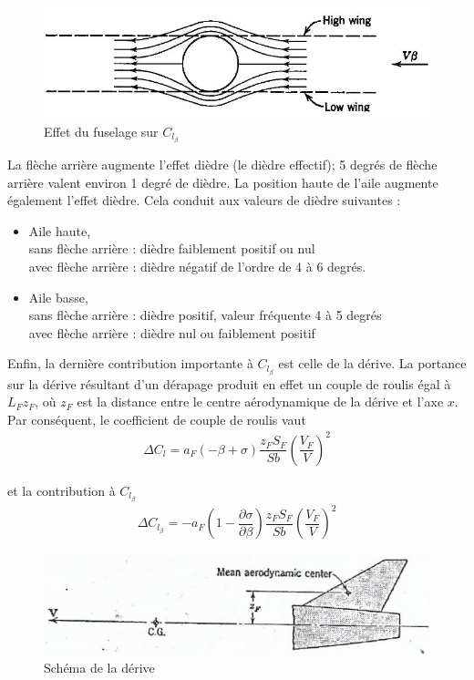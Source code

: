 \documentclass{report}
\begin{document}
\begin{figure}[h!]
    \centering
    \includegraphics[scale=0.7]{34.JPG}
    \caption{Effet du fuselage sur $C_{l_\beta}$}
    \label{34}
\end{figure}

La flèche arrière augmente l'effet dièdre (le dièdre effectif); 5 degrés de flèche arrière valent environ 1 degré de dièdre.
La position haute de l'aile augmente également l'effet dièdre. Cela conduit aux valeurs de dièdre suivantes :

\begin{itemize}
    \item Aile haute,\\
sans flèche arrière : dièdre faiblement positif ou nul\\
avec flèche arrière : dièdre négatif de l'ordre de 4 à 6 degrés.
\item Aile basse,\\
sans flèche arrière : dièdre positif, valeur fréquente 4 à 5 degrés\\
avec flèche arrière : dièdre nul ou faiblement positif
\end{itemize}


Enfin, la dernière contribution importante à $C_{l_\beta}$ est celle de la dérive. La portance sur la dérive résultant d'un dérapage produit en effet un couple de roulis égal à $L_Fz_F$, où $z_F$ est la distance entre le centre aérodynamique de la dérive et l'axe $x$. Par conséquent, le coefficient de couple de roulis vaut
\begin{eqnarray}
\Delta C_l=a_F(-\beta+\sigma)\dfrac{z_FS_F}{Sb}\left(\dfrac{V_F}{V}\right)^2
\end{eqnarray}

et la contribution à $C_{l_\beta}$
\begin{eqnarray}
\Delta C_{l_\beta}=-a_F\left(1-\dfrac{\partial\sigma}{\partial \beta}\right)\dfrac{z_FS_F}{Sb}\left(\dfrac{V_F}{V}\right)^2
\end{eqnarray}

\begin{figure}[h!]
    \centering
    \includegraphics[scale=0.7]{35.JPG}
    \caption{Schéma de la dérive}
    \label{35}
\end{figure}
\end{document}
